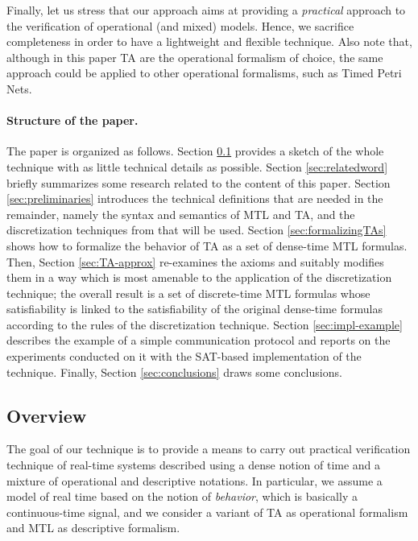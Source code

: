 \documentclass[a4paper]{article}
\theoremstyle{plain}
\theoremstyle{definition}
\begin{document}
Finally, let us stress that our approach aims at providing a \emph{practical} approach to the verification of operational (and mixed) models.
Hence, we sacrifice completeness in order to have a lightweight and flexible technique.
Also note that, although in this paper TA are the operational formalism of choice, the same approach could be applied to other operational formalisms, such as Timed Petri Nets.



\paragraph{Structure of the paper.}
The paper is organized as follows.
Section \ref{sec:overview} provides a sketch of the whole technique with as little technical details as possible.
Section \ref{sec:relatedword} briefly summarizes some research related to the content of this paper.
Section \ref{sec:preliminaries} introduces the technical definitions that are needed in the remainder, namely the syntax and semantics of MTL and TA, and the discretization techniques from \cite{FR06,FPR08-FM08} that will be used.
Section \ref{sec:formalizingTAs} shows how to formalize the behavior of TA as a set of dense-time MTL formulas.
Then, Section \ref{sec:TA-approx} re-examines the axioms and suitably modifies them in a way which is most amenable to the application of the discretization technique; the overall result is a set of discrete-time MTL formulas whose satisfiability is linked to the satisfiability of the original dense-time formulas according to the rules of the discretization technique.
Section \ref{sec:impl-example} describes the example of a simple communication protocol and reports on the experiments conducted on it with the SAT-based implementation of the technique.
Finally, Section \ref{sec:conclusions} draws some conclusions.



\subsection{Overview} \label{sec:overview}
The goal of our technique is to provide a means to carry out practical verification technique of real-time systems described using a dense notion of time and a mixture of operational and descriptive notations.
In particular, we assume a model of real time based on the notion of \emph{behavior}, which is basically a continuous-time signal, and we consider a variant of TA as operational formalism and MTL as descriptive formalism.
\end{document}
